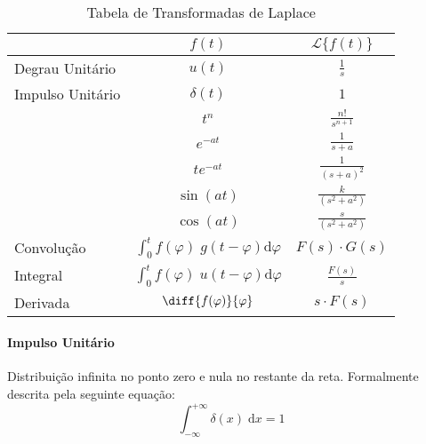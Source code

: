 \documentclass{article}
\begin{document}
                \begin{multicols}{2}
                    \raggedcolumns
                    \begin{table}[H]
                        \centering
                        \begingroup
                        \renewcommand{\arraystretch}{1.25}
                        \begin{tabular}[]{lcc}
                                             & $f(t)$      & $\mathcal{L}\{ f(t) \}$\\\hline
                            Degrau Unitário  & $u(t)$      & $\frac{1}{s}$\\
                            Impulso Unitário & $\delta(t)$ & $1$\\
                                             & $t^{n}$     & $\frac{n!}{s^{n+1}}$\\
                                             & $e^{-at}$   & $\frac{1}{s+a}$\\
                                             & $te^{-at}$  & $\frac{1}{(s+a)^{2}}$\\
                                             & $\sin(at)$  & $\frac{k}{(s^2+a^2)}$\\
                                             & $\cos(at)$  & $\frac{s}{(s^2+a^2)}$\\
                            Convolução       & $\int_{0}^{t} f(\varphi)\;g(t - \varphi) \text{d}\varphi$ & $F(s)\cdot G(s)$\\
                            Integral         & $\int_{0}^{t} f(\varphi)\;u(t - \varphi) \text{d}\varphi$ & $\frac{F(s)}{s}$\\
                            Derivada         & $\diff{f(\varphi)}{\varphi} $ & $s\cdot F(s)$\\\hline
                        \end{tabular}
                        \endgroup
                        \caption{Tabela de Transformadas de Laplace}\label{table:Laplace}
                    \end{table} \noindent

                    \columnbreak

                    \paragraph{Impulso Unitário}Distribuição infinita no ponto zero e nula no restante da reta. Formalmente descrita pela seguinte equação:
                        \begin{equation}
                            \boxed{
                                \int_{-\infty}^{+\infty} \delta(x) \; \text{d}x = 1
                            }
                        \end{equation}


\end{multicols}
\end{document}

